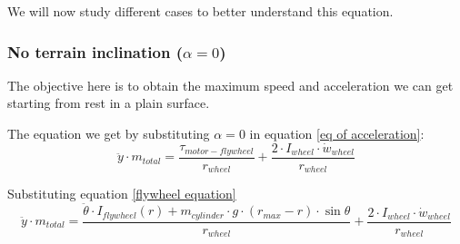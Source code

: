 We will now study different cases to better understand this equation.
\subsubsection{No terrain inclination ($\alpha = 0$)}
The objective here is to obtain the maximum speed and acceleration we can get starting from rest in a plain surface.

The equation we get by substituting $\alpha = 0$ in equation \ref{eq of acceleration}:
\[\ddot{y}\cdot m_{total} = \frac{\tau_{motor-flywheel}}{r_{wheel}} +\frac{2\cdot I_{wheel} \cdot  \dot{w}_{wheel}}{r_{wheel}}\]

Substituting equation \ref{flywheel equation}
\begin{equation}\label{no inclintation eq}
    \ddot{y}\cdot m_{total} = \frac{\ddot{\theta}\cdot I_{flywheel}(r) + m_{cylinder} \cdot  g \cdot  (r_{max} - r) \cdot  \sin{\theta}}{r_{wheel}} +\frac{2\cdot I_{wheel} \cdot  \dot{w}_{wheel}}{r_{wheel}}
\end{equation}


